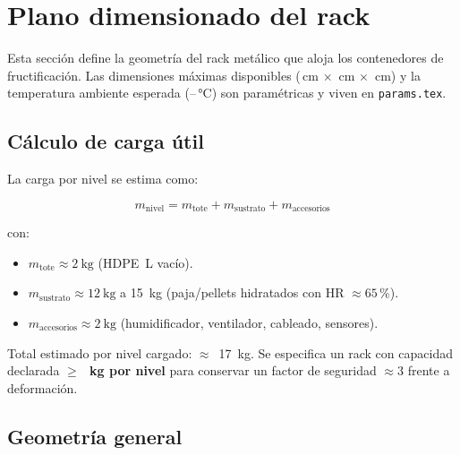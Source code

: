 \section{Plano dimensionado del rack}
\label{sec:rack}

Esta sección define la geometría del rack metálico que aloja los
\paramNcontenedores{} contenedores de fructificación. Las dimensiones
máximas disponibles (\paramHmax\,cm $\times$ \paramWmax\,cm $\times$
\paramDmax\,cm) y la temperatura ambiente esperada
(\paramTambMin--\paramTambMax\,\si{\celsius}) son paramétricas y viven
en \texttt{params.tex}.

\subsection{Cálculo de carga útil}
\label{sec:rack:carga}

La carga por nivel se estima como:

\begin{equation}
  m_{\text{nivel}} = m_{\text{tote}} + m_{\text{sustrato}} + m_{\text{accesorios}}
\end{equation}

\noindent con:
\begin{itemize}[leftmargin=*,itemsep=0pt]
  \item $m_{\text{tote}} \approx \SI{2}{\kilogram}$ (HDPE \paramVolTote\,L vacío).
  \item $m_{\text{sustrato}} \approx \SI{12}{\kilogram}$ a \SI{15}{\kilogram}
        (paja/pellets hidratados con HR $\approx 65$\,\%).
  \item $m_{\text{accesorios}} \approx \SI{2}{\kilogram}$ (humidificador,
        ventilador, cableado, sensores).
\end{itemize}

Total estimado por nivel cargado: $\approx$~\SI{17}{\kilogram}. Se
especifica un rack con capacidad declarada
\textbf{$\geq$~\paramCargaUtilNivel{}\,kg por nivel} para conservar un
factor de seguridad $\approx 3$ frente a deformación.

\subsection{Geometría general}
\label{sec:rack:geometria}

